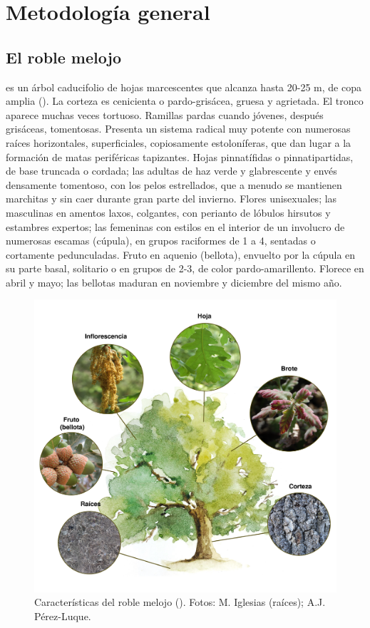 %
\chapter{\textcolor{ctcolormain}{Metodología general}}
\label{sec:metodologia}

\section{El roble melojo}
\label{sec:metodologia:qp}

\Qpw es un árbol caducifolio de hojas marcescentes que alcanza hasta 20-25 m, de copa amplia (). La corteza es cenicienta o pardo-grisácea, gruesa y agrietada. El tronco aparece muchas veces tortuoso. Ramillas pardas cuando jóvenes, después grisáceas, tomentosas. Presenta un sistema radical muy potente con numerosas raíces horizontales, superficiales, copiosamente estoloníferas, que dan lugar a la formación de matas periféricas tapizantes. Hojas pinnatífidas o pinnatipartidas, de base truncada o cordada; las adultas de haz verde y glabrescente y envés densamente tomentoso, con los pelos estrellados, que a menudo se mantienen marchitas y sin caer durante gran parte del invierno. Flores unisexuales; las masculinas en amentos laxos, colgantes, con perianto de lóbulos hirsutos y estambres expertos; las femeninas con estilos en el interior de un involucro de numerosas escamas (cúpula), en grupos raciformes de 1 a 4, sentadas o cortamente pedunculadas. Fruto en aquenio (bellota), envuelto por la cúpula en su parte basal, solitario o en grupos de 2-3, de color pardo-amarillento. Florece en abril y mayo; las bellotas maduran en noviembre y diciembre del mismo año.

\begin{figure}
	\centering
	\includegraphics[width=\textwidth]{img/metodologia/metodologia-features-qp.png} \caption{Características del roble melojo (\Qpw). Fotos: M. Iglesias (raíces); A.J. Pérez-Luque.} \label{fig:metodologia:features-qp}
\end{figure}

